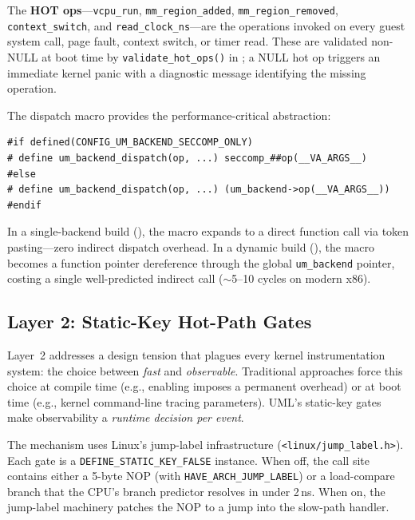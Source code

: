 The \textbf{HOT ops}---\texttt{vcpu\_run}, \texttt{mm\_region\_added},
\texttt{mm\_region\_removed}, \texttt{context\_switch}, and
\texttt{read\_clock\_ns}---are the operations invoked on every guest system
call, page fault, context switch, or timer read.  These are validated non-NULL
at boot time by \texttt{validate\_hot\_ops()} in
; a NULL hot op triggers an immediate kernel
panic with a diagnostic message identifying the missing operation.

The dispatch macro provides the performance-critical abstraction:

\begin{lstlisting}[language=KernelC, caption={The dispatch macro resolves at
  compile time in single-backend builds.}, label={lst:dispatch-macro}]
#if defined(CONFIG_UM_BACKEND_SECCOMP_ONLY)
# define um_backend_dispatch(op, ...) seccomp_##op(__VA_ARGS__)
#else
# define um_backend_dispatch(op, ...) (um_backend->op(__VA_ARGS__))
#endif
\end{lstlisting}

In a single-backend build (), the macro
expands to a direct function call via token pasting---zero indirect dispatch
overhead.  In a dynamic build (), the macro
becomes a function pointer dereference through the global
\texttt{um\_backend} pointer, costing a single well-predicted indirect call
($\sim$5--10 cycles on modern x86).


\subsection{Layer 2: Static-Key Hot-Path Gates}
\label{sec:layer2}

Layer~2 addresses a design tension that plagues every kernel instrumentation
system: the choice between \emph{fast} and \emph{observable}.  Traditional
approaches force this choice at compile time (e.g., enabling
 imposes a permanent overhead) or at boot time (e.g., kernel
command-line tracing parameters).  UML's static-key gates make observability a
\emph{runtime decision per event}.

The mechanism uses Linux's jump-label infrastructure
(\texttt{<linux/jump\_label.h>}).  Each gate is a
\texttt{DEFINE\_STATIC\_KEY\_FALSE} instance.  When off, the call site contains
either a 5-byte NOP (with \texttt{HAVE\_ARCH\_JUMP\_LABEL}) or a load-compare
branch that the CPU's branch predictor resolves in under 2\,ns.  When on, the
jump-label machinery patches the NOP to a jump into the slow-path handler.

